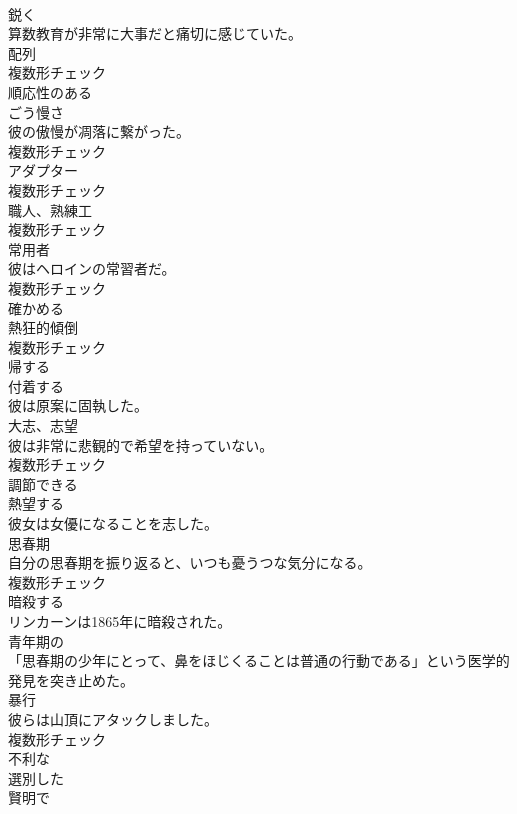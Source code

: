 \documentclass[8pt]{extreport}
\begin{document}
\begin{CJK}{UTF8}{min}
\\	[副詞]	鋭く	
\\	算数教育が非常に大事だと痛切に感じていた。	
\\	[名詞]	配列	
\\	複数形チェック
\\	[形容詞]	順応性のある	
\\	[名詞]	ごう慢さ	
\\	彼の傲慢が凋落に繋がった。	
\\	複数形チェック
\\	[名詞]	アダプター	
\\	複数形チェック
\\	[名詞]	職人、熟練工	
\\	複数形チェック
\\	[名詞]	常用者	
\\	彼はヘロインの常習者だ。	
\\	複数形チェック
\\	[動詞]	確かめる	
\\	[名詞]	熱狂的傾倒	
\\	複数形チェック
\\	[動詞]	帰する	
\\	[動詞]	付着する	
\\	彼は原案に固執した。	
\\	[名詞]	大志、志望	
\\	彼は非常に悲観的で希望を持っていない。	
\\	複数形チェック
\\	[形容詞]	調節できる	
\\	[動詞]	熱望する	
\\	彼女は女優になることを志した。	
\\	[名詞]	思春期	
\\	自分の思春期を振り返ると、いつも憂うつな気分になる。	
\\	複数形チェック
\\	[動詞]	暗殺する	
\\	リンカーンは1865年に暗殺された。	
\\	[形容詞]	⻘年期の	
\\	「思春期の少年にとって、鼻をほじくることは普通の行動である」という医学的発見を突き止めた。	
\\	[名詞]	暴行	
\\	彼らは山頂にアタックしました。	
\\	複数形チェック
\\	[形容詞]	不利な	
\\	[形容詞]	選別した	
\\	[形容詞]	賢明で	

\end{CJK}
\end{document}

